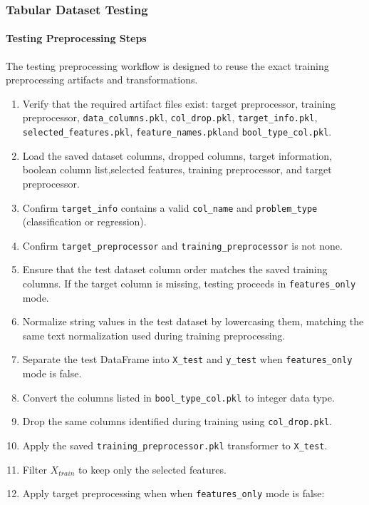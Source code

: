 \subsubsection{Tabular Dataset Testing}
\paragraph{Testing Preprocessing Steps}\par
The testing preprocessing workflow is designed to reuse the exact training preprocessing artifacts and transformations.

\begin{enumerate}
  \item Verify that the required artifact files exist:
        target preprocessor, training preprocessor,
        \texttt{data\_columns.pkl}, \texttt{col\_drop.pkl},
        \texttt{target\_info.pkl}, \texttt{selected\_features.pkl}, \texttt{feature\_names.pkl}and \texttt{bool\_type\_col.pkl}.
  \item Load the saved dataset columns, dropped columns, target information,
        boolean column list,selected features, training preprocessor, and target preprocessor.
  \item Confirm \texttt{target\_info} contains a valid \texttt{col\_name} and \texttt{problem\_type} (classification or regression).
  \item Confirm \texttt{target\_preprocessor} and \texttt{training\_preprocessor} is not none.
  \item Ensure that the test dataset column order matches the saved training columns. If the target column is missing, testing proceeds in \texttt{features\_only} mode.
  \item Normalize string values in the test dataset by lowercasing them, matching the same text normalization used during training preprocessing.
  \item Separate the test DataFrame into \texttt{X\_test} and \texttt{y\_test} when \texttt{features\_only} mode is false.
\item Convert the columns listed in \texttt{bool\_type\_col.pkl} to integer data type.  \item Drop the same columns identified during training using \texttt{col\_drop.pkl}.
  \item Apply the saved \texttt{training\_preprocessor.pkl} transformer to \texttt{X\_test}.
\item Filter $X_{train}$ to keep only the selected features.
  \item Apply target preprocessing when  when \texttt{features\_only} mode is false:

\end{enumerate}
